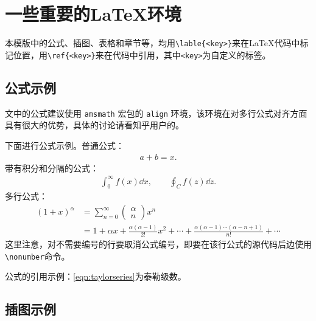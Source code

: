 \chapter{一些重要的\LaTeX{}环境}\label{chap:evm}

本模版中的公式、插图、表格和章节等，均用\texttt{\textbackslash lable\{<key>\}}来在\LaTeX{}代码中标记位置，用\texttt{\textbackslash ref\{<key>\}}来在代码中引用，其中\texttt{<key>}为自定义的标签。

\section{公式示例}

文中的公式建议使用 \texttt{amsmath} 宏包的 \texttt{align} 环境，该环境在对多行公式对齐方面具有很大的优势，具体的讨论请看知乎用户\href{https://www.zhihu.com/people/bo-xue-duo-wen-63}{}的\href{https://www.zhihu.com/question/477805692/answer/2045084752}{}。

下面进行公式示例。普通公式：
\begin{align}
    a+b=x.
\end{align}
带有积分和分隔的公式：
\begin{align}
   \int^{\infty}_{0} f(x)\dd{x}, \qquad \oint_{C} f(z)\dd {z}.
\end{align}
多行公式：
\begin{align}
    \left(1+x\right)^{\alpha} &= \sum^{\infty}_{n=0}\left(\begin{matrix} \alpha \\ n\end{matrix}\right)x^n \nonumber \\ 
    &= 1 + \alpha x + \frac{\alpha(\alpha-1)}{2!}x^2 + \cdots + \frac{\alpha(\alpha-1)\cdots(\alpha-n+1)}{n!} + \cdots
    \label{eqn:taylorseries}
\end{align}
这里注意，对不需要编号的行要取消公式编号，即要在该行公式的源代码后边使用\texttt{\textbackslash nonumber}命令。

公式的引用示例：\ref{eqn:taylorseries}为泰勒级数。

\section{插图示例}

